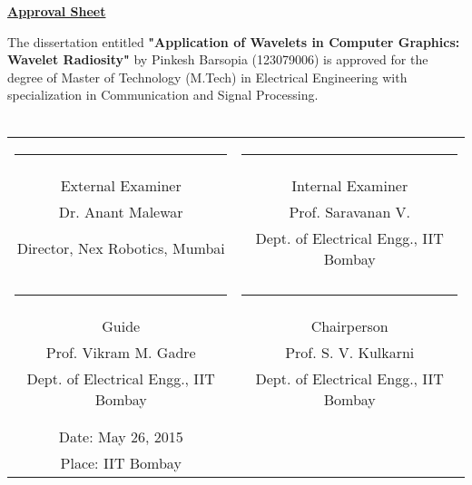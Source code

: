 \begin{titlepage}
\onehalfspacing
\begin{center}
	
\vspace{1cm}
\textbf{\large{\underline{Approval Sheet}}}\\
\vspace{0.5cm}
\end{center}
\doublespacing
The dissertation entitled \textbf{"Application of Wavelets in Computer Graphics: Wavelet Radiosity"} by Pinkesh Barsopia (123079006) is approved for the degree of Master of Technology (M.Tech) in Electrical Engineering with  specialization in Communication and Signal Processing.
\\ \\
\begin{center}
 \vfill \vfill
 \begin{tabular}{cc}
      \rule{6cm}{1sp}                  & \rule{6cm}{1sp} \\
      {\Large External Examiner}              & {\Large Internal Examiner} \\
      {Dr. Anant Malewar}	     & {Prof. Saravanan V.} \\			  	
      {Director, Nex Robotics, Mumbai} & {Dept. of Electrical Engg., IIT Bombay } \\[0.2in]\\
      \rule{6cm}{1sp}                &\rule{6cm}{1sp} \\
      {\Large Guide}                 & {\Large Chairperson} \\
      {Prof. Vikram M. Gadre}	     & {Prof. S. V. Kulkarni} \\
      {Dept. of Electrical Engg., IIT Bombay}	     & {Dept. of Electrical Engg., IIT Bombay}\\[0.2in]\\	\\
      {\large Date: May 26, 2015 }   & \\ 
      {\large Place: IIT Bombay}	&	
   \end{tabular}
 \vfill \vfill

\end{center}
\end{titlepage}
